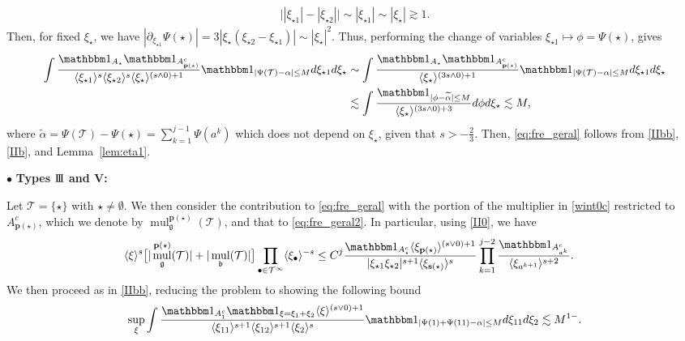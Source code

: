\documentclass[%
11pt,  reqno]{amsart}
\newcommand{\III}{\textup{I \hspace{-2.9mm} I \hspace{-2.9mm} I}}
\newcommand{\5}{\textup{V}}
\newcommand{\noi}{\noindent}
\newcommand{\ind}{\mathbbm 1}
\newcommand{\les}{\lesssim}
\newcommand{\wt}{\widetilde}
\theoremstyle{remark}
\newcommand{\bul}{\bullet}
\newcommand{\TT}{\mathcal{T}}
\newcommand{\al}{\alpha}
\newcommand{\bfrak}{\mathfrak{b}}
\newcommand{\gfrak}{\mathfrak{g}}
\newcommand{\pb}{\mathbf{p}}
\newcommand{\sbf}{\mathbf{s}}
\newcommand{\ges}{\gtrsim}
\newcommand{\jb}[1]
{\langle #1 \rangle}
\DeclareMathOperator{\mul}{mul}
\numberwithin{equation}{section}
\numberwithin{theorem}{section}
\begin{document}
\begin{align}
\big| |\xi_{\star1} |  - |\xi_{\star2}| \big| \sim |\xi_{\star1}| \sim |\xi_\star| \ges 1. 
\end{align}
Then, for fixed $\xi_\star$, we have $|\partial_{\xi_{\star1}} \Psi(\star) | = 3| \xi_\star  (\xi_{\star2} - \xi_{\star1})| \sim |\xi_{\star}|^2$. Thus, performing the change of variables $\xi_{\star1} \mapsto \phi = \Psi(\star)$, gives
\begin{align}\label{IIb}
\begin{split}
\int \frac{\ind_{A_\star} \ind_{A^c_{\pb(\star)}}}{ \jb{\xi_{\star1} }^s \jb{\xi_{\star2}}^s \jb{\xi_\star}^{(s\land0)+1}  } \ind_{|\Psi(\TT) - \al| \le M} d\xi_{\star1} d\xi_{\star}
&
\sim
\int \frac{\ind_{A_\star} \ind_{A^c_{\pb(\star)}}}{ \jb{\xi_\star}^{(3s\land0)+1}  } \ind_{|\Psi(\TT) - \al| \le M} d\xi_{\star1} d\xi_{\star}
\\
&
\les 
\int \frac{\ind_{|\phi - \wt\al| \le M} }{ \jb{\xi_\star}^{(3s\land0)+3}  } d\phi d\xi_{\star} \les M,
\end{split}
\end{align}
where $\wt\al = \Psi(\TT) - \Psi(\star) = \sum_{k=1}^{j-1} \Psi(a^{k})$ which does not depend on $\xi_{\star}$, given that $s>-\frac23$. 
Then,  \eqref{eq:fre_geral} follows from \eqref{IIbb}, \eqref{IIb}, and Lemma~\ref{lem:eta1}.







\smallskip 

\noi
$\bul$ \textbf{Types $\III$ and V: }

Let $\TT=\{\star\}$ with $\star\ne \emptyset$. We then consider the contribution to \eqref{eq:fre_geral} with the portion of the multiplier in \eqref{wint0c} restricted to $A^c_{\pb(\star)}$, which we denote by $\mul_{\gfrak}^{\pb(\star)}(\TT)$, and that to \eqref{eq:fre_geral2}. In particular, using \eqref{II0}, we have
\begin{align}
\jb{\xi}^s \big[  | \mul_{\gfrak}^{\pb(\star)}(\TT) | +  | \mul_{\bfrak}(\TT) | \big] \prod_{\bul \in \TT^\infty} \jb{\xi_\bul}^{-s}
&
\le C^j
\frac{\ind_{A_\star^c}  \jb{\xi_{\pb(\star)}}^{(s\lor 0)+1} }{ |\xi_{\star1} \xi_{\star2}|^{s+1} \jb{\xi_{\sbf(\star)}}^s} \prod_{k=1}^{j-2} \frac{\ind_{A^c_{a^k}}}{\jb{\xi_{a^{k+1}}}^{s+2}}. 
\end{align}
We then proceed as in \eqref{IIbb}, reducing the problem to showing the following bound
\begin{align}
\label{IIIa}
\sup_\xi \int \frac{ \ind_{A_1^c} \ind_{\xi=\xi_1+\xi_2} \jb{\xi}^{(s\lor 0)+1}  }{ \jb{\xi_{11}}^{s+1} \jb{\xi_{12}}^{s+1} \jb{\xi_{2}}^s }
\ind_{|\Psi(1) + \Psi(11) - \al| \le M}
d\xi_{11} d\xi_2 \les M^{1-}
.
\end{align}
\end{document}
